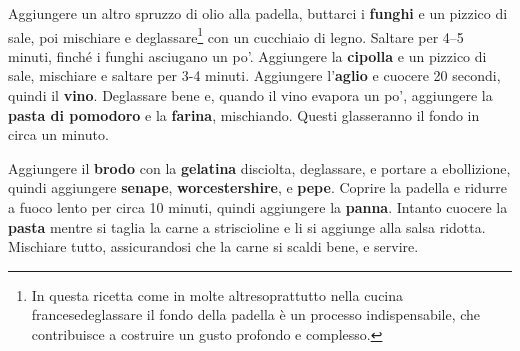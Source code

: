 Aggiungere un altro spruzzo di olio alla padella, buttarci i \textbf{funghi} e un pizzico di sale, poi mischiare e deglassare\footnote{In questa ricetta come in molte altre\textemdash soprattutto nella cucina francese\textemdash deglassare il fondo della padella è un processo indispensabile, che contribuisce a costruire un gusto profondo e complesso.} con un cucchiaio di legno.
Saltare per 4--5 minuti, finché i funghi asciugano un po'.
Aggiungere la \textbf{cipolla} e un pizzico di sale, mischiare e saltare per 3-4 minuti. 
Aggiungere l'\textbf{aglio} e cuocere 20 secondi, quindi il \textbf{vino}. 
Deglassare bene e, quando il vino evapora un po', aggiungere la \textbf{pasta di pomodoro} e la \textbf{farina}, mischiando. 
Questi glasseranno il fondo in circa un minuto. 

Aggiungere il \textbf{brodo} con la \textbf{gelatina} disciolta, deglassare, e portare a ebollizione, quindi aggiungere \textbf{senape}, \textbf{worcestershire}, e \textbf{pepe}. 
Coprire la padella e ridurre a fuoco lento per circa 10 minuti, quindi aggiungere la \textbf{panna}.
Intanto cuocere la \textbf{pasta} mentre si taglia la carne a striscioline e li si aggiunge alla salsa ridotta. 
Mischiare tutto, assicurandosi che la carne si scaldi bene, e servire. 





\begin{recipeblock}
	
\end{recipeblock}